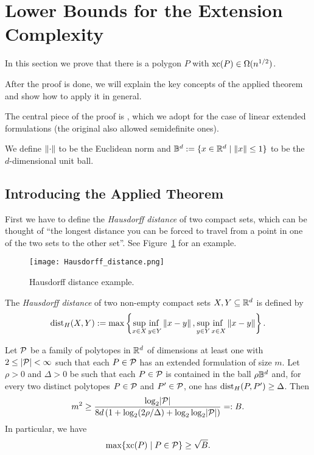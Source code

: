 \section{Lower Bounds for the Extension Complexity}

In this section we prove that there is a polygon $P$ with $\xc(P) \in \Omega(n^{1/2})$.

After the proof is done, we will explain the key concepts of the applied theorem and show how to apply it in general.

The central piece of the proof is \cite[Theorem~1]{averkov2016maximum}, which we adopt for the case of linear extended formulations (the original also allowed semidefinite ones).

We define $\norm{\cdot}$ to be the Euclidean norm and $\B^d := \{ x \in \R^d \mid \norm{x} \leq 1 \}$ to be the $d$-dimensional unit ball.



\subsection{Introducing the Applied Theorem}

First we have to define the \emph{Hausdorff distance} of two compact sets, which can be thought of ``the longest distance you can be forced to travel from a point in one of the two sets to the other set''. See Figure~\ref{fig:hausdorff} for an example.

\begin{figure}[ht]
  \centering
  \texttt{[image: Hausdorff\_distance.png]}
  \caption{Hausdorff distance example. \cite{rocchini2007hausdorff}}
  \label{fig:hausdorff}
\end{figure}

\begin{definition}
  The \emph{Hausdorff distance} of two non-empty compact sets $X, Y \subseteq \R^d$ is defined by $$ \dist_H(X,Y) := \max \left\{ \adjustlimits \sup_{x \in X} \inf_{y \in Y} \norm{x-y}, \adjustlimits \sup_{y \in Y} \inf_{x \in X} \norm{x-y} \right\} .$$
\end{definition}

\begin{theorem}\label{theorem:family}
  Let $\P$ be a family of polytopes in $\R^d$ of dimensions at least one with $2 \leq \abs{\P} < \infty $ such that each $P \in \P$ has an extended formulation of size $m$.
  Let $\rho > 0$ and $\Delta > 0$ be such that each $P \in \P$ is contained in the ball $\rho \B^d$ and,
  for every two distinct polytopes $P \in \P$ and $P' \in \P$, one has $\dist_H(P, P') \geq \Delta$.
  Then $$m^2 \geq \frac{\log_2 \abs{\P}}{8d \left(1 + \log_2 (2\rho/\Delta) + \log_2\log_2 \abs{\P} \right)} =: B.$$
  In particular, we have $$\max \{\xc(P) \mid P \in \P\}  \geq \sqrt{B} .$$
\end{theorem}



